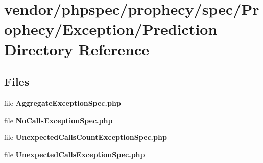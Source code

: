 \section{vendor/phpspec/prophecy/spec/\+Prophecy/\+Exception/\+Prediction Directory Reference}
\label{dir_b5409748f547a3f241db98aafd1f7dba}
\subsection*{Files}
\begin{DoxyCompactItemize}
\item 
file {\bf Aggregate\+Exception\+Spec.\+php}
\item 
file {\bf No\+Calls\+Exception\+Spec.\+php}
\item 
file {\bf Unexpected\+Calls\+Count\+Exception\+Spec.\+php}
\item 
file {\bf Unexpected\+Calls\+Exception\+Spec.\+php}
\end{DoxyCompactItemize}
